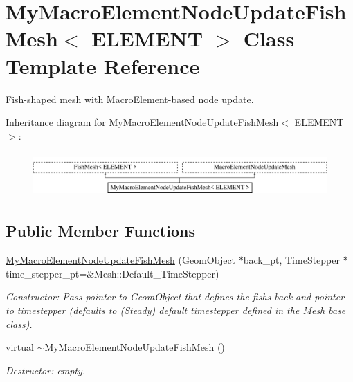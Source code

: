 \hypertarget{classMyMacroElementNodeUpdateFishMesh}{}\section{My\+Macro\+Element\+Node\+Update\+Fish\+Mesh$<$ E\+L\+E\+M\+E\+NT $>$ Class Template Reference}
\label{classMyMacroElementNodeUpdateFishMesh}


Fish-\/shaped mesh with Macro\+Element-\/based node update.  


Inheritance diagram for My\+Macro\+Element\+Node\+Update\+Fish\+Mesh$<$ E\+L\+E\+M\+E\+NT $>$\+:\begin{figure}[H]
\begin{center}
\leavevmode
\includegraphics[height=1.723077cm]{classMyMacroElementNodeUpdateFishMesh}
\end{center}
\end{figure}
\subsection*{Public Member Functions}
\begin{DoxyCompactItemize}
\item 
\hyperlink{classMyMacroElementNodeUpdateFishMesh_aa5f87bdc70d79e5361e5c38f6ff0f2ba}{My\+Macro\+Element\+Node\+Update\+Fish\+Mesh} (Geom\+Object $\ast$back\+\_\+pt, Time\+Stepper $\ast$time\+\_\+stepper\+\_\+pt=\&Mesh\+::\+Default\+\_\+\+Time\+Stepper)
\begin{DoxyCompactList}\small\item\em Constructor\+: Pass pointer to Geom\+Object that defines the fish\textquotesingle{}s back and pointer to timestepper (defaults to (Steady) default timestepper defined in the Mesh base class). \end{DoxyCompactList}\item 
virtual \hyperlink{classMyMacroElementNodeUpdateFishMesh_a4498627c037a3f16330ec0c2ff820d1c}{$\sim$\+My\+Macro\+Element\+Node\+Update\+Fish\+Mesh} ()
\begin{DoxyCompactList}\small\item\em Destructor\+: empty. \end{DoxyCompactList}\end{DoxyCompactItemize}


